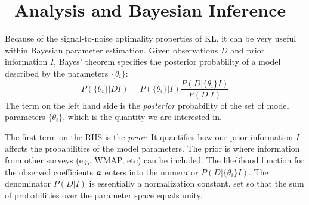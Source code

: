 \section{\KL\ Analysis and Bayesian Inference}
\label{sec:KL_bayes}
Because of the signal-to-noise optimality properties of KL, it can be
very useful within Bayesian parameter estimation.  
Given observations $D$ and prior information $I$, Bayes' theorem specifies the
posterior probability of a model described by the parameters $\{\theta_i\}$:
\begin{equation}
  \label{eq:bayes}
  P(\{\theta_i\}|DI) = P(\{\theta_i\}|I) \frac{P(D|\{\theta_i\}I)}{P(D|I)}
\end{equation}
The term on the left hand side
is the \textit{posterior} probability of the set of
model parameters $\{\theta_i\}$, which is the quantity we are interested in.

The first term on the RHS is the \textit{prior}.  It quantifies how our prior
information $I$ affects the probabilities of the model parameters.  The 
prior is where information from other surveys (e.g. WMAP, etc) can be
included. The likelihood function for the observed coefficients $\boldsymbol{a}$
enters into the numerator $P(D|\{\theta_i\}I)$.  The denominator $P(D|I)$
is essentially a normalization constant, set so that the sum of probabilities
over the parameter space equals unity.

